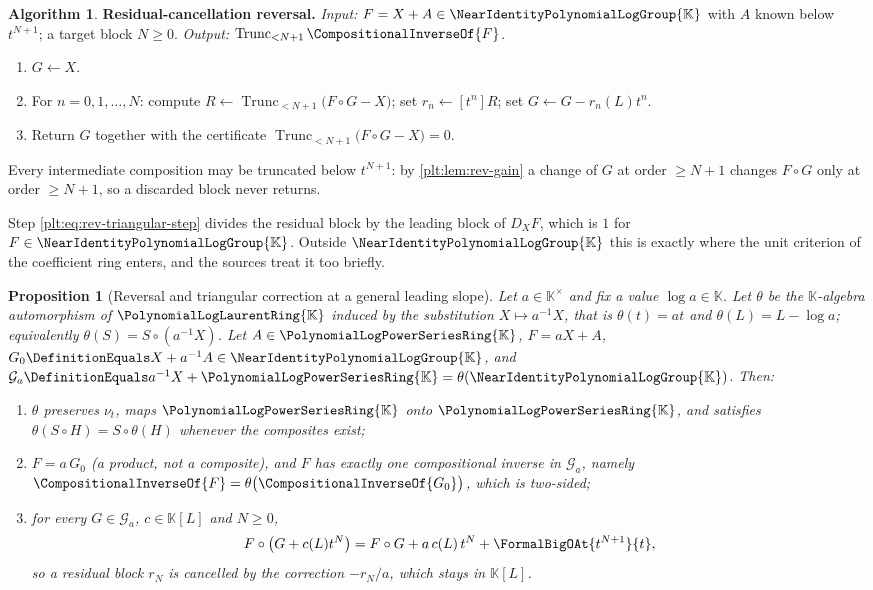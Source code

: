 \documentclass[11pt,oneside]{article}
\theoremstyle{plain}
\newtheorem{proposition}[theorem]{Proposition}
\theoremstyle{definition}
\newtheorem{algorithm}[theorem]{Algorithm}
\theoremstyle{remark}
\newcommand{\K}{\mathbb{K}}
\newcommand{\PLpow}{\PolynomialLogPowerSeriesRing{\K}}   %
\newcommand{\PLlau}{\PolynomialLogLaurentRing{\K}}       %
\newcommand{\Gnear}{\NearIdentityPolynomialLogGroup{\K}} %
\newcommand{\ordt}{\nu_{t}}                              %
\newcommand{\Trunc}[2]{\operatorname{Trunc}_{<#2}#1}     %
\newcommand{\DX}{D_{X}}                                  %
\newcommand{\compose}{\mathbin{\circ}}
\newcommand{\rev}[1]{\CompositionalInverseOf{#1}}
\begin{document}
\begin{algorithm}
\label{plt:alg:rev-triangular}
\textbf{Residual-cancellation reversal.}
\emph{Input:} \(F=X+A\in\Gnear\) with \(A\) known below \(t^{N+1}\); a target
block \(N\ge0\).  \emph{Output:} \(\Trunc{\rev{F}}{N+1}\).
\begin{enumerate}
\item \(G\leftarrow X\).
\item For \(n=0,1,\dots,N\): compute
 \(R\leftarrow\Trunc{\bigl(F\compose G-X\bigr)}{N+1}\); set
 \(r_n\leftarrow[t^n]R\); set \(G\leftarrow G-r_n(L)t^n\).
\item Return \(G\) together with the certificate
 \(\Trunc{\bigl(F\compose G-X\bigr)}{N+1}=0\).
\end{enumerate}
Every intermediate composition may be truncated below \(t^{N+1}\): by
\cref{plt:lem:rev-gain} a change of \(G\) at order \(\ge N+1\) changes
\(F\compose G\) only at order \(\ge N+1\), so a discarded block never returns.
\end{algorithm}

Step \eqref{plt:eq:rev-triangular-step} divides the residual block by the
leading block of \(\DX F\), which is \(1\) for \(F\in\Gnear\).  Outside
\(\Gnear\) this is exactly where the unit criterion of the coefficient ring
enters, and the sources treat it too briefly.

\begin{proposition}[Reversal and triangular correction at a general leading
slope]
\label{plt:prop:rev-general-slope}
Let \(a\in\K^\times\) and fix a value \(\log a\in\K\).  Let \(\theta\) be the
\(\K\)-algebra automorphism of \(\PLlau\) induced by the substitution
\(X\mapsto a^{-1}X\), that is \(\theta(t)=at\) and \(\theta(L)=L-\log a\);
equivalently \(\theta(S)=S\compose(a^{-1}X)\).  Let \(A\in\PLpow\),
\(F=aX+A\), \(G_0\DefinitionEquals X+a^{-1}A\in\Gnear\), and
\(\mathcal G_a\DefinitionEquals a^{-1}X+\PLpow=\theta(\Gnear)\).  Then:
\begin{enumerate}
\item \(\theta\) preserves \(\ordt\), maps \(\PLpow\) onto \(\PLpow\), and
satisfies \(\theta(S\compose H)=S\compose\theta(H)\) whenever the composites
exist;
\item \(F=a\,G_0\) (a product, not a composite), and \(F\) has exactly one
compositional inverse in \(\mathcal G_a\), namely
\(\rev{F}=\theta\bigl(\rev{G_0}\bigr)\), which is two-sided;
\item for every \(G\in\mathcal G_a\), \(c\in\K[L]\) and \(N\ge0\),
\begin{equation}\label{plt:eq:rev-general-slope}
 F\compose\bigl(G+c(L)t^N\bigr)=F\compose G+a\,c(L)\,t^N
 +\FormalBigOAt{t^{N+1}}{t},
\end{equation}
so a residual block \(r_N\) is cancelled by the correction \(-r_N/a\), which
stays in \(\K[L]\).
\end{enumerate}
\end{proposition}
\end{document}
